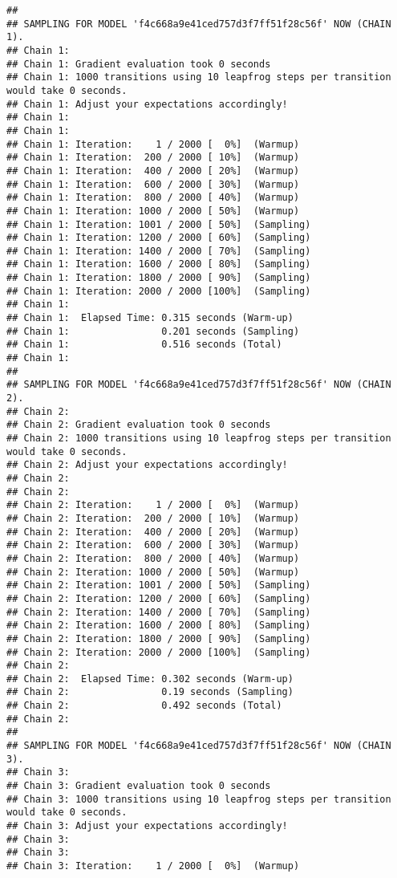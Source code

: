 \documentclass[
]{article}
\begin{document}
\begin{verbatim}
## 
## SAMPLING FOR MODEL 'f4c668a9e41ced757d3f7ff51f28c56f' NOW (CHAIN 1).
## Chain 1: 
## Chain 1: Gradient evaluation took 0 seconds
## Chain 1: 1000 transitions using 10 leapfrog steps per transition would take 0 seconds.
## Chain 1: Adjust your expectations accordingly!
## Chain 1: 
## Chain 1: 
## Chain 1: Iteration:    1 / 2000 [  0%]  (Warmup)
## Chain 1: Iteration:  200 / 2000 [ 10%]  (Warmup)
## Chain 1: Iteration:  400 / 2000 [ 20%]  (Warmup)
## Chain 1: Iteration:  600 / 2000 [ 30%]  (Warmup)
## Chain 1: Iteration:  800 / 2000 [ 40%]  (Warmup)
## Chain 1: Iteration: 1000 / 2000 [ 50%]  (Warmup)
## Chain 1: Iteration: 1001 / 2000 [ 50%]  (Sampling)
## Chain 1: Iteration: 1200 / 2000 [ 60%]  (Sampling)
## Chain 1: Iteration: 1400 / 2000 [ 70%]  (Sampling)
## Chain 1: Iteration: 1600 / 2000 [ 80%]  (Sampling)
## Chain 1: Iteration: 1800 / 2000 [ 90%]  (Sampling)
## Chain 1: Iteration: 2000 / 2000 [100%]  (Sampling)
## Chain 1: 
## Chain 1:  Elapsed Time: 0.315 seconds (Warm-up)
## Chain 1:                0.201 seconds (Sampling)
## Chain 1:                0.516 seconds (Total)
## Chain 1: 
## 
## SAMPLING FOR MODEL 'f4c668a9e41ced757d3f7ff51f28c56f' NOW (CHAIN 2).
## Chain 2: 
## Chain 2: Gradient evaluation took 0 seconds
## Chain 2: 1000 transitions using 10 leapfrog steps per transition would take 0 seconds.
## Chain 2: Adjust your expectations accordingly!
## Chain 2: 
## Chain 2: 
## Chain 2: Iteration:    1 / 2000 [  0%]  (Warmup)
## Chain 2: Iteration:  200 / 2000 [ 10%]  (Warmup)
## Chain 2: Iteration:  400 / 2000 [ 20%]  (Warmup)
## Chain 2: Iteration:  600 / 2000 [ 30%]  (Warmup)
## Chain 2: Iteration:  800 / 2000 [ 40%]  (Warmup)
## Chain 2: Iteration: 1000 / 2000 [ 50%]  (Warmup)
## Chain 2: Iteration: 1001 / 2000 [ 50%]  (Sampling)
## Chain 2: Iteration: 1200 / 2000 [ 60%]  (Sampling)
## Chain 2: Iteration: 1400 / 2000 [ 70%]  (Sampling)
## Chain 2: Iteration: 1600 / 2000 [ 80%]  (Sampling)
## Chain 2: Iteration: 1800 / 2000 [ 90%]  (Sampling)
## Chain 2: Iteration: 2000 / 2000 [100%]  (Sampling)
## Chain 2: 
## Chain 2:  Elapsed Time: 0.302 seconds (Warm-up)
## Chain 2:                0.19 seconds (Sampling)
## Chain 2:                0.492 seconds (Total)
## Chain 2: 
## 
## SAMPLING FOR MODEL 'f4c668a9e41ced757d3f7ff51f28c56f' NOW (CHAIN 3).
## Chain 3: 
## Chain 3: Gradient evaluation took 0 seconds
## Chain 3: 1000 transitions using 10 leapfrog steps per transition would take 0 seconds.
## Chain 3: Adjust your expectations accordingly!
## Chain 3: 
## Chain 3: 
## Chain 3: Iteration:    1 / 2000 [  0%]  (Warmup)

\end{verbatim}
\end{document}

